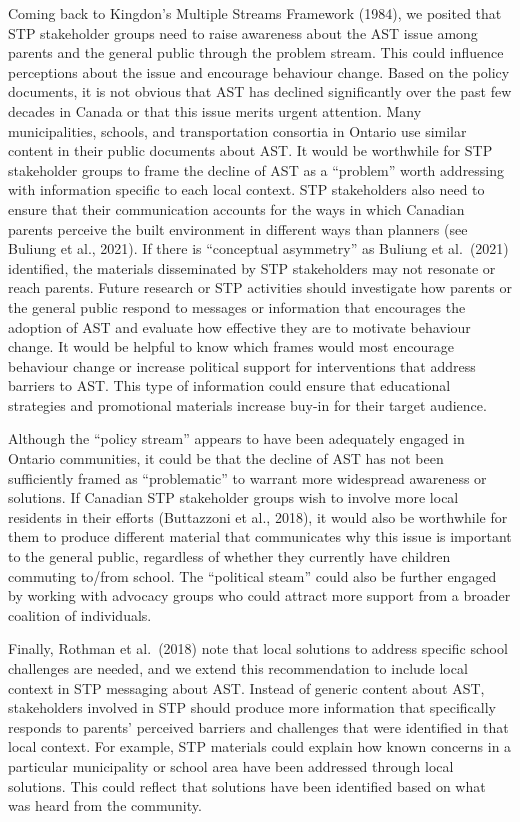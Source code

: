 \documentclass[]{elsarticle} %
\begin{document}
Coming back to Kingdon's Multiple Streams Framework (1984), we posited
that STP stakeholder groups need to raise awareness about the AST issue
among parents and the general public through the problem stream. This
could influence perceptions about the issue and encourage behaviour
change. Based on the policy documents, it is not obvious that AST has
declined significantly over the past few decades in Canada or that this
issue merits urgent attention. Many municipalities, schools, and
transportation consortia in Ontario use similar content in their public
documents about AST. It would be worthwhile for STP stakeholder groups
to frame the decline of AST as a ``problem'' worth addressing with
information specific to each local context. STP stakeholders also need
to ensure that their communication accounts for the ways in which
Canadian parents perceive the built environment in different ways than
planners (see Buliung et al., 2021). If there is ``conceptual
asymmetry'' as Buliung et al.~(2021) identified, the materials
disseminated by STP stakeholders may not resonate or reach parents.
Future research or STP activities should investigate how parents or the
general public respond to messages or information that encourages the
adoption of AST and evaluate how effective they are to motivate
behaviour change. It would be helpful to know which frames would most
encourage behaviour change or increase political support for
interventions that address barriers to AST. This type of information
could ensure that educational strategies and promotional materials
increase buy-in for their target audience.

Although the ``policy stream'' appears to have been adequately engaged
in Ontario communities, it could be that the decline of AST has not been
sufficiently framed as ``problematic'' to warrant more widespread
awareness or solutions. If Canadian STP stakeholder groups wish to
involve more local residents in their efforts (Buttazzoni et al., 2018),
it would also be worthwhile for them to produce different material that
communicates why this issue is important to the general public,
regardless of whether they currently have children commuting to/from
school. The ``political steam'' could also be further engaged by working
with advocacy groups who could attract more support from a broader
coalition of individuals.

Finally, Rothman et al.~(2018) note that local solutions to address
specific school challenges are needed, and we extend this recommendation
to include local context in STP messaging about AST. Instead of generic
content about AST, stakeholders involved in STP should produce more
information that specifically responds to parents' perceived barriers
and challenges that were identified in that local context. For example,
STP materials could explain how known concerns in a particular
municipality or school area have been addressed through local solutions.
This could reflect that solutions have been identified based on what was
heard from the community.
\end{document}
